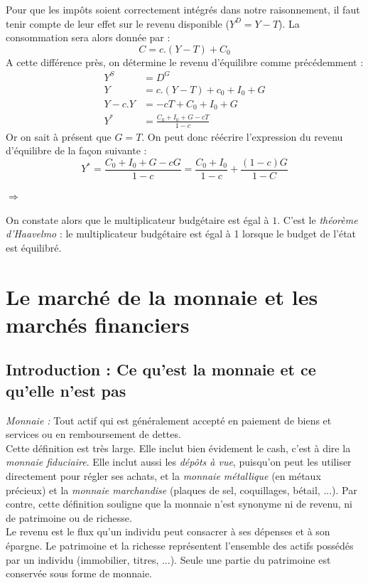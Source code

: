 \documentclass[10pt]{book}
\begin{document}
Pour que les impôts soient correctement intégrés dans notre raisonnement, il faut tenir compte de leur effet sur le revenu disponible ($Y^D = Y - T$). La consommation sera alors donnée par :
$$ C = c.(Y - T) + C_0 $$
A cette différence près, on détermine le revenu d'équilibre comme précédemment : 
\begin{align*}
  Y^S & = D^G \\
  Y & = c.(Y-T) + c_0 + I_0 + G \\
  Y -c.Y & = -cT + C_0 + I_0 + G \\
  Y^* & = \frac{C_0 + I_0 + G - cT}{1-c}
\end{align*}
Or on sait à présent que $G = T$. On peut donc réécrire l'expression du revenu d'équilibre de la façon suivante :
$$ Y^* = \frac{C_0 + I_0 + G - cG}{1-c} = \frac{C_0 + I_0}{1 - c} + \frac{(1-c)G}{1-C} $$
\begin{center}
  $\Rightarrow$  
\end{center}
On constate alors que le multiplicateur budgétaire est égal à $1$. C'est le \textit{théorème d'Haavelmo} : le multiplicateur budgétaire est égal à 1 lorsque le budget de l'état est équilibré.

\chapter{Le marché de la monnaie et les marchés financiers}
\section{Introduction : Ce qu'est la monnaie et ce qu'elle n'est pas}
\textit{Monnaie :} Tout actif qui est généralement accepté en paiement de biens et services ou en remboursement de dettes. \\
Cette définition est très large. Elle inclut bien évidement le cash, c'est à dire la \textit{monnaie fiduciaire}. Elle inclut aussi les \textit{dépôts à vue}, puisqu'on peut les utiliser directement pour régler ses achats, et la \textit{monnaie métallique} (en métaux précieux) et la \textit{monnaie marchandise} (plaques de sel, coquillages, bétail, ...). Par contre, cette définition souligne que la monnaie n'est synonyme ni de revenu, ni de patrimoine ou de richesse. \\
Le revenu est le flux qu'un individu peut consacrer à ses dépenses et à son épargne. Le patrimoine et la richesse représentent l'ensemble des actifs possédés par un individu (immobilier, titres, ...). Seule une partie du patrimoine est conservée sous forme de monnaie.
\end{document}
